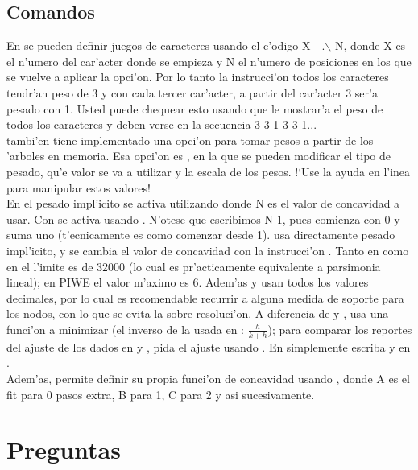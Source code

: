 \subsection{Comandos}
En  se pueden definir juegos de caracteres usando el c'odigo X - .$\backslash$ N, donde X es el n'umero del car'acter donde se empieza y N el n'umero de posiciones en los que se vuelve a aplicar la opci'on. Por lo tanto la instrucci'on  todos los caracteres tendr'an peso de 3 y con  cada tercer car'acter, a partir del car'acter 3 ser'a pesado con 1. Usted puede chequear esto usando  que le mostrar'a el peso de todos los caracteres y deben verse en la secuencia 3 3 1 3 3 1...\\
 tambi'en tiene implementado una opci'on para tomar pesos a partir de los 'arboles en memoria. Esa opci'on es , en la que se pueden modificar el tipo de pesado, qu'e valor se va a utilizar y la escala de los pesos. !`Use la ayuda en l'inea para manipular estos valores!\\
En  el pesado impl'icito se activa utilizando  donde N es el valor de concavidad a usar. Con  se activa usando . N'otese que escribimos N-1, pues  comienza con 0 y suma uno (t'ecnicamente es como comenzar desde 1).  usa directamente pesado impl'icito, y se cambia el valor de concavidad con la instrucci'on . Tanto en  como en  el l'imite es de 32000 (lo cual es pr'acticamente equivalente a parsimonia lineal); en PIWE el valor m'aximo es 6. Adem'as  y  usan todos los valores decimales, por lo cual es recomendable recurrir a alguna medida de soporte para los nodos, con lo que se evita la sobre-resoluci'on. A diferencia de  y ,  usa una funci'on a minimizar (el inverso de la usada en : $\frac{h}{k + h}$); para comparar los reportes del ajuste de los dados en  y , pida el ajuste usando .  En  simplemente escriba  y en  .\\
Adem'as,  permite definir su propia funci'on de concavidad usando \Cmd{piwe [A B C...;}, donde A es el fit para 0 pasos extra, B para 1, C para 2 y asi sucesivamente.
\section{Preguntas}
